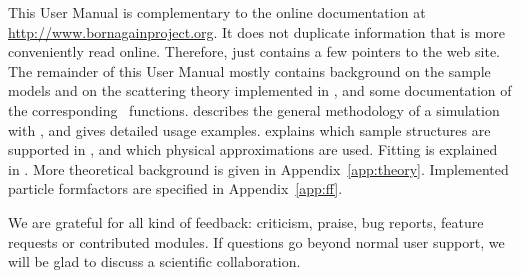 This User Manual is complementary to the online documentation
at \url{http://www.bornagainproject.org}.
It does not duplicate information that is more conveniently read online.
Therefore,  just contains a few pointers to the web site.
The remainder of this User Manual mostly contains background
on the sample models and on the scattering theory implemented in \BornAgain,
and some documentation of the corresponding \Python\ functions.
 describes
the general methodology of a simulation with \BornAgain,
and gives detailed usage examples.
 explains
which sample structures are supported in \BornAgain,
and which physical approximations are used.
Fitting is explained in .
More theoretical background is given in Appendix~\ref{app:theory}.
Implemented particle formfactors are specified in Appendix~\ref{app:ff}.


\noindent
{}
We are grateful for all kind of feedback:
criticism, praise, bug reports, feature requests or contributed modules.
If questions go beyond normal user support,
we will be glad to discuss a scientific collaboration.
